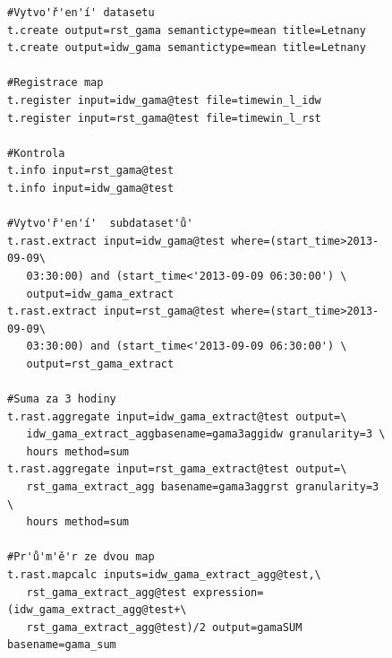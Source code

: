 \documentclass[a4paper,12pt,oneside]{report}
\begin{document}
\begin{figure}[h!]
\begin{footnotesize}
\lstset{extendedchars=false,
escapeinside=''}
\begin{lstlisting}[style=mybash]
#Vytvo'ř'en'í' datasetu
t.create output=rst_gama semantictype=mean title=Letnany
t.create output=idw_gama semantictype=mean title=Letnany

#Registrace map 
t.register input=idw_gama@test file=timewin_l_idw
t.register input=rst_gama@test file=timewin_l_rst

#Kontrola
t.info input=rst_gama@test                                                      
t.info input=idw_gama@test

#Vytvo'ř'en'í'  subdataset'ů'
t.rast.extract input=idw_gama@test where=(start_time>2013-09-09\
   03:30:00) and (start_time<'2013-09-09 06:30:00') \
   output=idw_gama_extract
t.rast.extract input=rst_gama@test where=(start_time>2013-09-09\
   03:30:00) and (start_time<'2013-09-09 06:30:00') \
   output=rst_gama_extract

#Suma za 3 hodiny
t.rast.aggregate input=idw_gama_extract@test output=\
   idw_gama_extract_aggbasename=gama3aggidw granularity=3 \
   hours method=sum
t.rast.aggregate input=rst_gama_extract@test output=\
   rst_gama_extract_agg basename=gama3aggrst granularity=3 \
   hours method=sum

#Pr'ů'm'ě'r ze dvou map
t.rast.mapcalc inputs=idw_gama_extract_agg@test,\
   rst_gama_extract_agg@test expression=(idw_gama_extract_agg@test+\
   rst_gama_extract_agg@test)/2 output=gamaSUM basename=gama_sum
\end{lstlisting}
\end{footnotesize} 
\end{figure}
\end{document}
